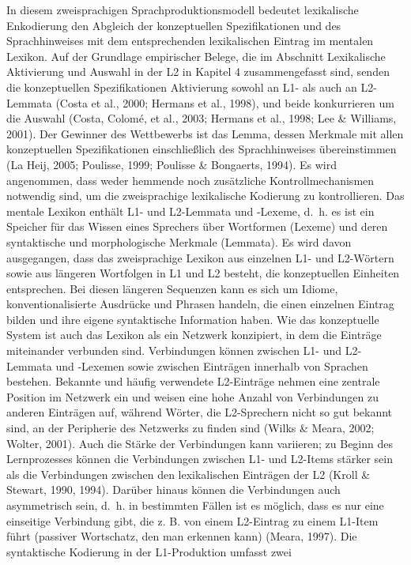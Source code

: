 \documentclass[
  letterpaper,
]{scrbook}
\begin{document}
In diesem zweisprachigen Sprachproduktionsmodell bedeutet lexikalische
Enkodierung den Abgleich der konzeptuellen Spezifikationen und des
Sprachhinweises mit dem entsprechenden lexikalischen Eintrag im mentalen
Lexikon. Auf der Grundlage empirischer Belege, die im Abschnitt
Lexikalische Aktivierung und Auswahl in der L2 in Kapitel 4
zusammengefasst sind, senden die konzeptuellen Spezifikationen
Aktivierung sowohl an L1- als auch an L2-Lemmata (Costa et al., 2000;
Hermans et al., 1998), und beide konkurrieren um die Auswahl (Costa,
Colomé, et al., 2003; Hermans et al., 1998; Lee \& Williams, 2001). Der
Gewinner des Wettbewerbs ist das Lemma, dessen Merkmale mit allen
konzeptuellen Spezifikationen einschließlich des Sprachhinweises
übereinstimmen (La Heij, 2005; Poulisse, 1999; Poulisse \& Bongaerts,
1994). Es wird angenommen, dass weder hemmende noch zusätzliche
Kontrollmechanismen notwendig sind, um die zweisprachige lexikalische
Kodierung zu kontrollieren. Das mentale Lexikon enthält L1- und
L2-Lemmata und -Lexeme, d.~h. es ist ein Speicher für das Wissen eines
Sprechers über Wortformen (Lexeme) und deren syntaktische und
morphologische Merkmale (Lemmata). Es wird davon ausgegangen, dass das
zweisprachige Lexikon aus einzelnen L1- und L2-Wörtern sowie aus
längeren Wortfolgen in L1 und L2 besteht, die konzeptuellen Einheiten
entsprechen. Bei diesen längeren Sequenzen kann es sich um Idiome,
konventionalisierte Ausdrücke und Phrasen handeln, die einen einzelnen
Eintrag bilden und ihre eigene syntaktische Information haben. Wie das
konzeptuelle System ist auch das Lexikon als ein Netzwerk konzipiert, in
dem die Einträge miteinander verbunden sind. Verbindungen können
zwischen L1- und L2-Lemmata und -Lexemen sowie zwischen Einträgen
innerhalb von Sprachen bestehen. Bekannte und häufig verwendete
L2-Einträge nehmen eine zentrale Position im Netzwerk ein und weisen
eine hohe Anzahl von Verbindungen zu anderen Einträgen auf, während
Wörter, die L2-Sprechern nicht so gut bekannt sind, an der Peripherie
des Netzwerks zu finden sind (Wilks \& Meara, 2002; Wolter, 2001). Auch
die Stärke der Verbindungen kann variieren; zu Beginn des Lernprozesses
können die Verbindungen zwischen L1- und L2-Items stärker sein als die
Verbindungen zwischen den lexikalischen Einträgen der L2 (Kroll \&
Stewart, 1990, 1994). Darüber hinaus können die Verbindungen auch
asymmetrisch sein, d.~h. in bestimmten Fällen ist es möglich, dass es
nur eine einseitige Verbindung gibt, die z. B. von einem L2-Eintrag zu
einem L1-Item führt (passiver Wortschatz, den man erkennen kann) (Meara,
1997). Die syntaktische Kodierung in der L1-Produktion umfasst zwei
\end{document}
